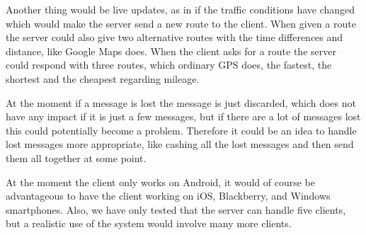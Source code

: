 Another thing would be live updates, as in if the traffic conditions have changed which would make the server send a new route to the client. When given a route the server could also give two alternative routes with the time differences and distance, like Google Maps does.
When the client asks for a route the server could respond with three routes, which ordinary GPS does, the fastest, the shortest and the cheapest regarding  mileage.

At the moment if a message is lost the message is just discarded, which does not have any impact if it is just a few messages, but if there are a lot of messages lost this could potentially become a problem. Therefore it could be an idea to handle lost messages more appropriate, like cashing all the lost messages and then send them all together at some point.

At the moment the client only works on Android, it would of course be advantageous to have the client working on iOS, Blackberry, and Windows smartphones. Also, we have only tested that the server can handle five clients, but a realistic use of the system would involve many more clients.
